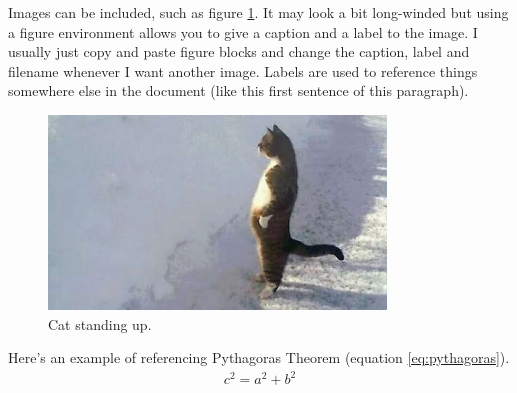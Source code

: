 \documentclass[12pt]{article}
\begin{document}
Images can be included, such as figure \ref{fig:cat}. It may look a bit long-winded but using a figure environment allows you to give a caption and a label to the image. I usually just copy and paste figure blocks and change the caption, label and filename whenever I want another image. Labels are used to reference things somewhere else in the document (like this first sentence of this paragraph).

\begin{figure}[H]	%
	\centering 		%
	\includegraphics[width=0.8\textwidth]{cat}	%
	\caption{Cat standing up.}	%
	\label{fig:cat}	%
\end{figure}

Here's an example of referencing Pythagoras Theorem (equation \ref{eq:pythagoras}).
\begin{align} \label{eq:pythagoras}
	c^2 = a^2 + b^2
\end{align}





\printbibliography
\end{document}
